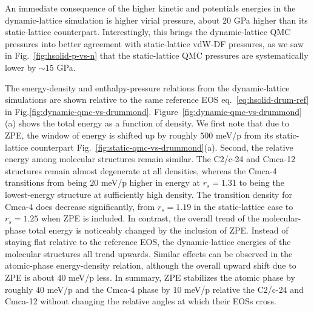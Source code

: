 An immediate consequence of the higher kinetic and potentials energies in the dynamic-lattice simulation is higher virial pressure, about $20$ GPa higher than its static-lattice counterpart.
Interestingly, this brings the dynamic-lattice QMC pressures into better agreement with static-lattice vdW-DF pressures, as we saw in Fig.~\ref{fig:hsolid-p-vs-n} that the static-lattice QMC pressures are systematically lower by $\sim 15$ GPa.

The energy-density and enthalpy-pressure relations from the dynamic-lattice simulations are shown relative to the same reference EOS eq.~\ref{eq:hsolid-drum-ref} in Fig.\ref{fig:dynamic-qmc-vs-drummond}.
Figure~\ref{fig:dynamic-qmc-vs-drummond}(a) shows the total energy as a function of density.
We first note that due to ZPE, the window of energy is shifted up by roughly $500$ meV/p from its static-lattice counterpart Fig.~\ref{fig:static-qmc-vs-drummond}(a).
Second, the relative energy among molecular structures remain similar.
The C2/c-24 and Cmca-12 structures remain almost degenerate at all densities, whereas the Cmca-4 transitions from being $20$ meV/p higher in energy at $r_s=1.31$ to being the lowest-energy structure at sufficiently high density.
The transition density for Cmca-4 does decrease significantly, from $r_s=1.19$ in the static-lattice case to $r_s=1.25$ when ZPE is included.
In contrast, the overall trend of the molecular-phase total energy is noticeably changed by the inclusion of ZPE.
Instead of staying flat relative to the reference EOS, the dynamic-lattice energies of the molecular structures all trend upwards.
Similar effects can be observed in the atomic-phase energy-density relation, although the overall upward shift due to ZPE is about $40$ meV/p less.
In summary, ZPE stabilizes the atomic phase by roughly $40$ meV/p and the Cmca-4 phase by $10$ meV/p relative the C2/c-24 and Cmca-12 without changing the relative angles at which their EOSs cross.

